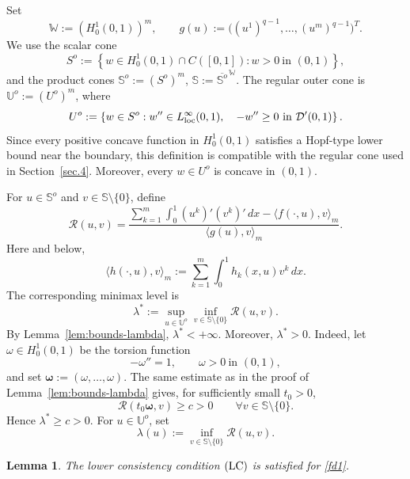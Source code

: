 \documentclass[preprint,10pt]{elsarticle}
\numberwithin{equation}{section}
\newtheorem{lem}[thm]{Lemma}
\begin{document}
Set
\[
\mathbb W:=(H_0^1(0,1))^m,
\qquad
g(u):=\bigl((u^1)^{q-1},\ldots,(u^m)^{q-1}\bigr)^T .
\]
We use the scalar cone
\[
S^o
:=
\left\{
w\in H_0^1(0,1)\cap C([0,1]):
w>0 \ \text{in }(0,1)
\right\},
\]
and the product cones \(\mathbb S^o:=(S^o)^m\),
\(\mathbb S:=\overline{\mathbb S^o}^{\,\mathbb W}\). The regular outer cone
is \(\mathbb U^o:=(U^o)^m\), where
\[
U^o
:=
\left\{
w\in S^o:
w''\in L^\infty_{\rm loc}(0,1),
\quad
-w''\ge0
\text{ in }\mathcal D'(0,1)
\right\}.
\]
Since every positive concave function in \(H_0^1(0,1)\) satisfies a
Hopf-type lower bound near the boundary, this definition is compatible with
the regular cone used in Section~\ref{sec.4}. Moreover, every \(w\in U^o\) is
concave in \((0,1)\).

For \(u\in\mathbb S^o\) and \(v\in\mathbb S\setminus\{0\}\), define
\[
\mathcal R(u,v)
=
\frac{
	\displaystyle
	\sum_{k=1}^m\int_0^1 (u^k)'(v^k)'\,dx
	-
	\langle f(\cdot,u),v\rangle_m
}{
	\displaystyle
	\langle g(u),v\rangle_m
}.
\]
Here and below,
\[
\langle h(\cdot,u),v\rangle_m
:=
\sum_{k=1}^m\int_0^1 h_k(x,u)v^k\,dx .
\]
The corresponding minimax level is
\[
\lambda^*
:=
\sup_{u\in\mathbb U^o}
\inf_{v\in\mathbb S\setminus\{0\}}
\mathcal R(u,v).
\]
By Lemma~\ref{lem:bounds-lambda}, \(\lambda^*<+\infty\). Moreover,
\(\lambda^*>0\). Indeed, let \(\omega\in H_0^1(0,1)\) be the torsion function
\[
-\omega''=1,\qquad \omega>0 \ \text{in }(0,1),
\]
and set \(\boldsymbol\omega:=(\omega,\ldots,\omega)\). The same estimate as in
the proof of Lemma~\ref{lem:bounds-lambda} gives, for sufficiently small
\(t_0>0\),
\[
\mathcal R(t_0\boldsymbol\omega,v)\ge c>0
\qquad
\forall v\in\mathbb S\setminus\{0\}.
\]
Hence \(\lambda^*\ge c>0\). For \(u\in\mathbb U^o\), set
\[
\lambda(u):=
\inf_{v\in\mathbb S\setminus\{0\}}\mathcal R(u,v).
\]

\begin{lem}
	\label{lem:LC-1d-system}
	The lower consistency condition \({\rm (LC)}\) is satisfied for
	\eqref{fd1}.
\end{lem}
\end{document}
